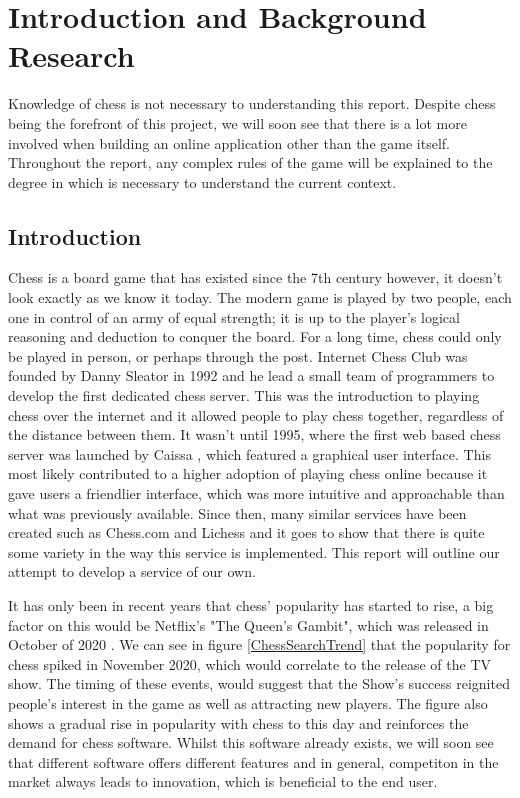 \chapter{Introduction and Background Research}

\label{chapter1}

Knowledge of chess is not necessary to understanding this report. Despite chess being the forefront of this project, we will soon see that there is a lot more involved when building an online application other than the game itself. Throughout the report, any complex rules of the game will be explained to the degree in which is necessary to understand the current context.

\section{Introduction}
\label{sec:Introduction}

Chess is a board game that has existed since the 7th century \cite{HistoryOfChess} however, it doesn't look exactly as we know it today. The modern game is played by two people, each one in control of an army of equal strength; it is up to the player's logical reasoning and deduction to conquer the board. For a long time, chess could only be played in person, or perhaps through the post. Internet Chess Club was founded by Danny Sleator in 1992 \cite{InternetChessClub} and he lead a small team of programmers to develop the first dedicated chess server. This was the introduction to playing chess over the internet and it allowed people to play chess together, regardless of the distance between them. It wasn't until 1995, where the first web based chess server was launched by Caissa \cite{CaissaAboutPage}, which featured a graphical user interface. This most likely contributed to a higher adoption of playing chess online because it gave users a friendlier interface, which was more intuitive and approachable than what was previously available. Since then, many similar services have been created such as Chess.com and Lichess and it goes to show that there is quite some variety in the way this service is implemented. This report will outline our attempt to develop a service of our own.

It has only been in recent years that chess' popularity has started to rise, a big factor on this would be Netflix's "The Queen's Gambit", which was released in October of 2020 \cite{TheQueensGambit}. We can see in figure \ref{ChessSearchTrend} that the popularity for chess spiked in November 2020, which would correlate to the release of the TV show. The timing of these events, would suggest that the Show's success reignited people's interest in the game as well as attracting new players. The figure also shows a gradual rise in popularity with chess to this day and reinforces the demand for chess software. Whilst this software already exists, we will soon see that different software offers different features and in general, competiton in the market always leads to innovation, which is beneficial to the end user.

